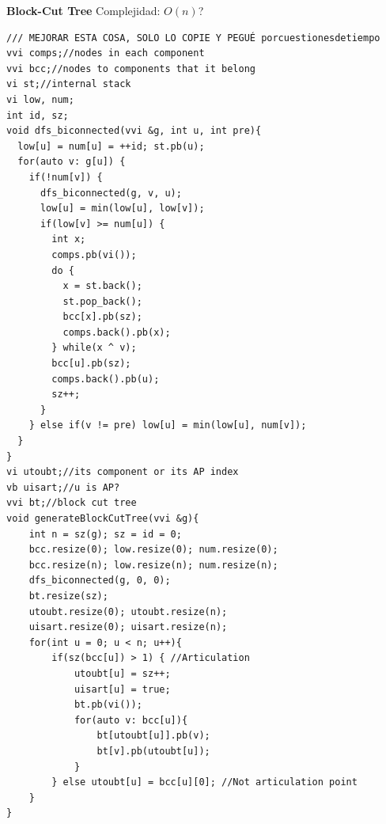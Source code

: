 \textbf{Block-Cut Tree} Complejidad: $O(n)$?
\begin{verbatim}
/// MEJORAR ESTA COSA, SOLO LO COPIE Y PEGUÉ porcuestionesdetiempo
vvi comps;//nodes in each component
vvi bcc;//nodes to components that it belong
vi st;//internal stack
vi low, num;
int id, sz;
void dfs_biconnected(vvi &g, int u, int pre){
  low[u] = num[u] = ++id; st.pb(u);
  for(auto v: g[u]) {
    if(!num[v]) {
      dfs_biconnected(g, v, u);
      low[u] = min(low[u], low[v]);
      if(low[v] >= num[u]) {
        int x;
        comps.pb(vi());
        do {
          x = st.back();
          st.pop_back();
          bcc[x].pb(sz);
          comps.back().pb(x);
        } while(x ^ v);
        bcc[u].pb(sz);
        comps.back().pb(u);
        sz++;
      }
    } else if(v != pre) low[u] = min(low[u], num[v]);
  }
}
vi utoubt;//its component or its AP index
vb uisart;//u is AP?
vvi bt;//block cut tree
void generateBlockCutTree(vvi &g){
    int n = sz(g); sz = id = 0;
    bcc.resize(0); low.resize(0); num.resize(0);
    bcc.resize(n); low.resize(n); num.resize(n);
    dfs_biconnected(g, 0, 0);
    bt.resize(sz);
    utoubt.resize(0); utoubt.resize(n);
    uisart.resize(0); uisart.resize(n);
    for(int u = 0; u < n; u++){
        if(sz(bcc[u]) > 1) { //Articulation
            utoubt[u] = sz++;
            uisart[u] = true;
            bt.pb(vi());
            for(auto v: bcc[u]){
                bt[utoubt[u]].pb(v);
                bt[v].pb(utoubt[u]);
            }
        } else utoubt[u] = bcc[u][0]; //Not articulation point
    }
}
\end{verbatim}






